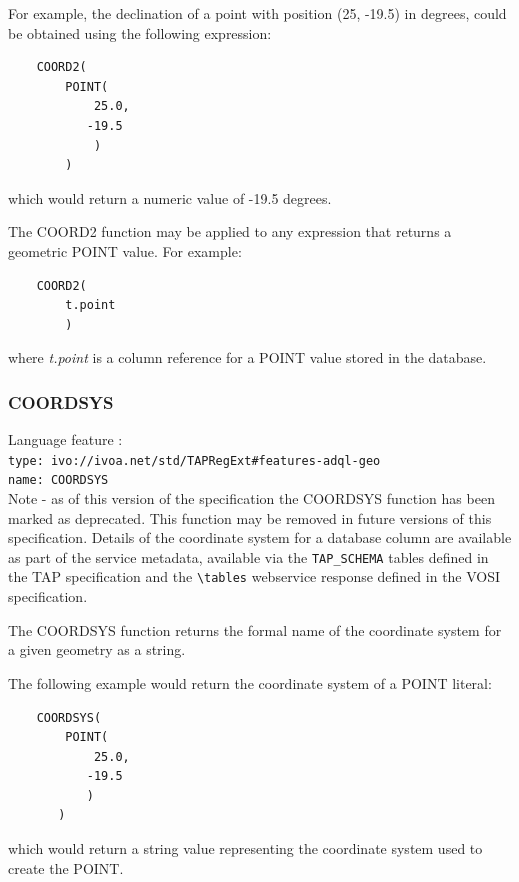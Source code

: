\documentclass[11pt,a4paper]{ivoa}
\newcommand{\TAPspec}{TAP specification\xspace}
\newcommand{\VOSIspec}{VOSI specification\xspace}
\begin{document}
For example, the declination of a point with position (25, -19.5) in degrees,
could be obtained using the following expression:
\begin{verbatim}
    COORD2(
        POINT(
            25.0,
           -19.5
            )
        )
\end{verbatim}
\noindent
which would return a numeric value of -19.5 degrees.

The COORD2 function may be applied to any expression that returns a
geometric POINT value.
For example:
\begin{verbatim}
    COORD2(
        t.point
        )
\end{verbatim}
\noindent
where \textit{t.point} is a column reference for a POINT value
stored in the database.

\subsubsection{COORDSYS}
\label{sec:functions.geom.coordsys}
{\footnotesize Language feature :}\\
{\footnotesize \verb|type: ivo://ivoa.net/std/TAPRegExt#features-adql-geo|}\\
{\footnotesize \verb|name: COORDSYS|}\\

Note - as of this version of the specification the COORDSYS function has
been marked as deprecated. This function may be removed in future versions
of this specification.
Details of the coordinate system for a database column are available as part of
the service metadata, available via the \verb:TAP_SCHEMA: tables defined in the
\TAPspec and the \verb:\tables: webservice response defined in the \VOSIspec.


The COORDSYS function returns the formal name of the coordinate system for
a given geometry as a string.

The following example would return the coordinate system of a POINT literal:
\begin{verbatim}
    COORDSYS(
        POINT(
            25.0,
           -19.5
           )
       )
\end{verbatim}
\noindent
which would return a string value representing the coordinate system used
to create the POINT.
\end{document}
